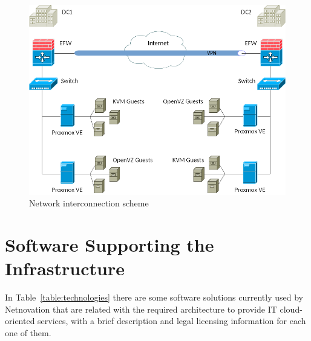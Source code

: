 \documentclass[a4paper, 12pt]{book}
\begin{document}
\begin{figure}[H]
  \centering
  \includegraphics[scale=1.80]{network_scheme.png}
  \caption[Network interconnection scheme]{Network interconnection scheme}
  \label{fig:network}
\end{figure}


\section{Software Supporting the Infrastructure}
\label{sec:software}

In Table~\ref{table:technologies} there are some software solutions currently used by Netnovation that are related with the required architecture to provide IT cloud-oriented services, with a brief description and legal licensing information for each one of them.
\end{document}
